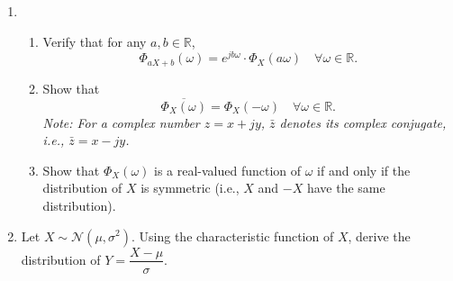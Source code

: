 \documentclass[11pt]{article}
\begin{document}
\begin{enumerate}
\item 
\begin{enumerate}
	\item Verify that for any $a,b\in \mathbb{R}$, 
	\begin{equation*}
	\Phi_{aX+b}(\omega)=e^{jb\omega}\cdot \Phi_{X}(a\omega)\quad \forall\omega\in \mathbb{R}.
	\end{equation*} 
	\item Show that 
	\begin{equation*}
	\overline{\Phi_{X}(\omega)}=\Phi_{X}(-\omega)\quad \forall\omega\in \mathbb{R}.
	\end{equation*} 
	\emph{Note: For a complex number $z=x+jy$,  $\bar{z}$ denotes its complex conjugate, i.e., $\bar{z}=x-jy$.}
	\item Show that $\Phi_{X}(\omega)$ is a real-valued function of $\omega$ if and only if the distribution of $X$ is symmetric (i.e., $X$ and $-X$ have the same distribution). 
\end{enumerate}

\item Let $X\sim \mathcal{N}(\mu,\sigma^{2})$. Using the characteristic function of $X$, derive the distribution of $Y=\dfrac{X-\mu}{\sigma}$.


\end{enumerate}
\end{document}
